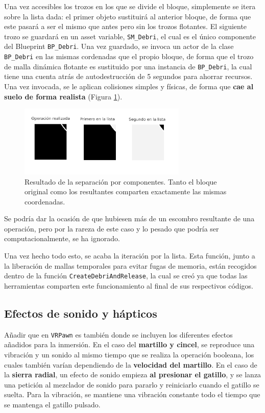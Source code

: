 Una vez accesibles los trozos en los que se divide el bloque, simplemente se itera sobre la lista dada: el primer objeto sustituirá al anterior bloque, de forma que este pasará a ser el mismo que antes pero sin los trozos flotantes. El siguiente trozo se guardará en un asset variable, \texttt{SM\_Debri}, el cual es el único componente del Blueprint \texttt{BP\_Debri}. Una vez guardado, se invoca un actor de la clase \texttt{BP\_Debri} en las mismas cordenadas que el propio bloque, de forma que el trozo de malla dinámica flotante es sustituido por una instancia de \texttt{BP\_Debri}, la cual tiene una cuenta atrás de autodestrucción de 5 segundos para ahorrar recursos. Una vez invocada, se le aplican colisiones simples y físicas, de forma que \textbf{cae al suelo de forma realista} (Figura \ref{fig:debri}).

\begin{figure}[H]
	\centering
	\includegraphics[width=8cm]{imagenes/debri}
	\caption{Resultado de la separación por componentes. Tanto el bloque original como los resultantes comparten exactamente las mismas coordenadas.}
	\label{fig:debri}
\end{figure}

Se podría dar la ocasión de que hubiesen más de un escombro resultante de una operación, pero por la rareza de este caso y lo pesado que podría ser computacionalmente, se ha ignorado.

Una vez hecho todo esto, se acaba la iteración por la lista. Esta función, junto a la liberación de mallas temporales para evitar fugas de memoria, están recogidos dentro de la función \texttt{CreateDebriAndRelease}, la cual se creó ya que todas las herramientas comparten este funcionamiento al final de sus respectivos códigos.

\subsection{Efectos de sonido y hápticos}

Añadir que en \texttt{VRPawn} es también donde se incluyen los diferentes efectos añadidos para la inmersión. En el caso del \textbf{martillo y cincel}, se reproduce una vibración y un sonido al mismo tiempo que se realiza la operación booleana, los cuales también varían dependiendo de la \textbf{velocidad del martillo}. En el caso de la \textbf{sierra radial}, un efecto de sonido empieza \textbf{al presionar el gatillo}, y se lanza una petición al mezclador de sonido para pararlo y reiniciarlo cuando el gatillo se suelta. Para la vibración, se mantiene una vibración constante todo el tiempo que se mantenga el gatillo pulsado.

